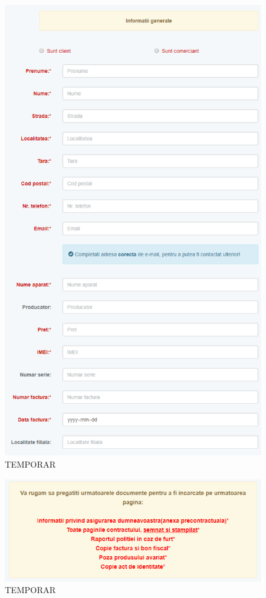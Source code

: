 	\begin{figure}
		\includegraphics[width=0.9\linewidth]{../imagini/register_informatii_generale.png}
		\caption{TEMPORAR}
		\label{fig:TEMP}
	\end{figure}
	\begin{figure}
		\includegraphics[width=\linewidth]{../imagini/register_poze.png}
		\caption{TEMPORAR}
		\label{fig:TEMP}
	\end{figure}
